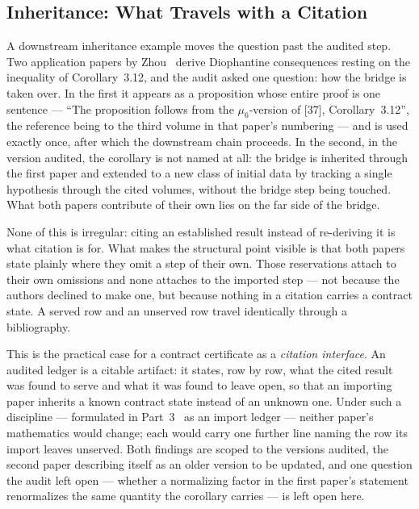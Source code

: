 \documentclass[11pt,a4paper]{article}
\begin{document}
\subsection{Inheritance: What Travels with a Citation}\label{sec:abc-inheritance}

A downstream inheritance example moves the question past the audited step. Two
application papers by
Zhou~\cite{ZhouI,ZhouII} derive Diophantine consequences resting on the
inequality of Corollary~3.12, and the audit asked one question: how the bridge is
taken over. In the first it appears as a proposition whose entire proof is one
sentence --- ``The proposition follows from the $\mu_6$-version of [37],
Corollary~3.12'', the reference being to the third volume in that paper's
numbering --- and is used exactly once, after which the downstream chain
proceeds. In the second, in the version audited, the corollary is not named at
all: the bridge is inherited through the first paper and extended to a new class
of initial data by tracking a single hypothesis through the cited volumes,
without the bridge step being touched. What both papers contribute of their own
lies on the far side of the bridge.

None of this is irregular: citing an established result instead of re-deriving it
is what citation is for. What makes the structural point visible is that both
papers state plainly where they omit a step of their own. Those reservations
attach to their own omissions and none attaches to the imported step --- not
because the authors declined to make one, but because nothing in a citation
carries a contract state. A served row and an unserved row travel identically
through a bibliography.

This is the practical case for a contract certificate as a \emph{citation
interface}. An audited ledger is a citable artifact: it states, row by row, what
the cited result was found to serve and what it was found to leave open, so that
an importing paper inherits a known contract state instead of an unknown one.
Under such a discipline --- formulated in Part~3~\cite{part3} as an import ledger
--- neither paper's mathematics would change; each would carry one further line
naming the row its import leaves unserved. Both findings are scoped to the
versions audited, the second paper describing itself as an older version to be
updated, and one question the audit left open --- whether a normalizing factor in
the first paper's statement renormalizes the same quantity the corollary carries
--- is left open here.
\end{document}
